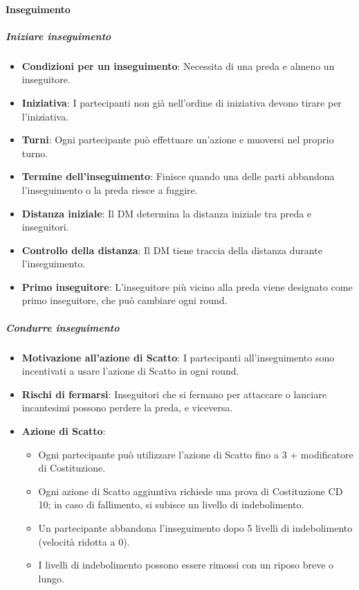 
\paragraph{Inseguimento}
\subparagraph*{Iniziare inseguimento}

\begin{itemize}
    \item \textbf{Condizioni per un inseguimento}: Necessita di una preda e almeno un inseguitore.
    \item \textbf{Iniziativa}: I partecipanti non già nell’ordine di iniziativa devono tirare per l’iniziativa.
    \item \textbf{Turni}: Ogni partecipante può effettuare un’azione e muoversi nel proprio turno.
    \item \textbf{Termine dell'inseguimento}: Finisce quando una delle parti abbandona l'inseguimento o la preda riesce a fuggire.
    \item \textbf{Distanza iniziale}: Il DM determina la distanza iniziale tra preda e inseguitori.
    \item \textbf{Controllo della distanza}: Il DM tiene traccia della distanza durante l'inseguimento.
    \item \textbf{Primo inseguitore}: L'inseguitore più vicino alla preda viene designato come primo inseguitore, che può cambiare ogni round.
\end{itemize}

\subparagraph*{Condurre inseguimento}

\begin{itemize}
    \item \textbf{Motivazione all'azione di Scatto}: I partecipanti all'inseguimento sono incentivati a usare l'azione di Scatto in ogni round.
    \item \textbf{Rischi di fermarsi}: Inseguitori che si fermano per attaccare o lanciare incantesimi possono perdere la preda, e viceversa.
    \item \textbf{Azione di Scatto}: 
    \begin{itemize}
        \item Ogni partecipante può utilizzare l'azione di Scatto fino a 3 + modificatore di Costituzione.
        \item Ogni azione di Scatto aggiuntiva richiede una prova di Costituzione CD 10; in caso di fallimento, si subisce un livello di indebolimento.
        \item Un partecipante abbandona l'inseguimento dopo 5 livelli di indebolimento (velocità ridotta a 0).
        \item I livelli di indebolimento possono essere rimossi con un riposo breve o lungo.
    \end{itemize}
\end{itemize}

